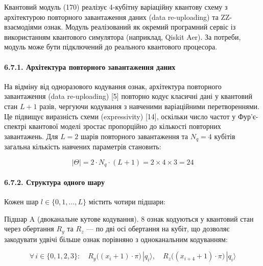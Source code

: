 \documentclass[12pt,a4paper]{article}
\begin{document}
Квантовий модуль (170) реалізує 4-кубітну варіаційну квантову схему з архітектурою повторного завантаження даних (data re-uploading) та ZZ-взаємодіями ознак. Модуль реалізований як окремий програмний сервіс із використанням квантового симулятора (наприклад, Qiskit Aer). За потреби, модуль може бути підключений до реального квантового процесора.



\paragraph{6.7.1. Архітектура повторного завантаження даних}\label{ux430ux440ux445ux456ux442ux435ux43aux442ux443ux440ux430-ux43fux43eux432ux442ux43eux440ux43dux43eux433ux43e-ux437ux430ux432ux430ux43dux442ux430ux436ux435ux43dux43dux44f-ux434ux430ux43dux438ux445}



На відміну від одноразового кодування ознак, архітектура повторного завантаження (data re-uploading) {[}5{]} повторно кодує класичні дані у квантовий стан \(L + 1\) разів, чергуючи кодування з навченими варіаційними перетвореннями. Це підвищує виразність схеми (expressivity) {[}14{]}, оскільки число частот у Фур'є-спектрі квантової моделі зростає пропорційно до кількості повторних завантажень. Для \(L = 2\) шарів повторного завантаження та \(N_q = 4\) кубітів загальна кількість навчених параметрів становить:



\[|\Theta| = 2 \cdot N_q \cdot (L + 1) = 2 \times 4 \times 3 = 24\]



\paragraph{6.7.2. Структура одного шару}\label{ux441ux442ux440ux443ux43aux442ux443ux440ux430-ux43eux434ux43dux43eux433ux43e-ux448ux430ux440ux443}



Кожен шар \(l \in \{0, 1, \ldots, L\}\) містить чотири підшари:



Підшар A (двоканальне кутове кодування). 8 ознак кодуються у квантовий стан через обертання \(R_y\) та \(R_z\) --- по дві осі обертання на кубіт, що дозволяє закодувати удвічі більше ознак порівняно з одноканальним кодуванням:



\[\forall\,i \in \{0,1,2,3\}:\quad R_y\bigl((x_i + 1) \cdot \pi\bigr)\,|q_i\rangle, \quad R_z\bigl((x_{i+4} + 1) \cdot \pi\bigr)\,|q_i\rangle\]
\end{document}
